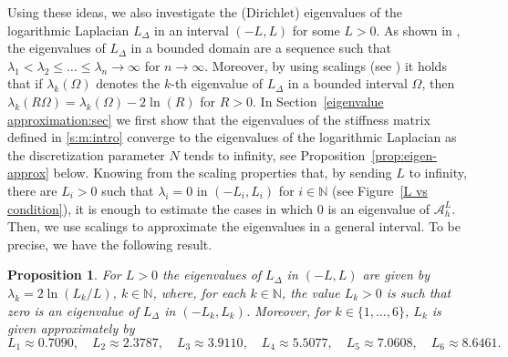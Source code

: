 \documentclass[10 pt]{article}
\newtheorem{proposition}[theorem]{Proposition}
\numberwithin{equation}{section}
\def\N{\mathbb{N}}
\begin{document}
Using these ideas, we also investigate the (Dirichlet) eigenvalues of the logarithmic Laplacian $L_{\Delta}$ in an interval $(-L,L)$ for some $L>0$. As shown in \cite[Theorem 1.4]{CW19}, the eigenvalues of $L_{\Delta}$ in a bounded domain are a sequence such that $\lambda_1<\lambda_2\leq \ldots\leq\lambda_n\to \infty$ for $n\to\infty$.  Moreover, by using scalings (see \cite[Lemma 2.5]{LW21}) it holds that if $\lambda_k(\Omega)$ denotes the $k$-th eigenvalue of $L_{\Delta}$ in a bounded interval $\Omega$, then $\lambda_k(R\Omega)=\lambda_k(\Omega)-2\ln(R)$ for $R>0$. In Section~\ref{eigenvalue approximation:sec} we first show that the eigenvalues of the stiffness matrix defined in \eqref{s:m:intro} converge to the eigenvalues of the logarithmic Laplacian as the discretization parameter $N$ tends to infinity, see Proposition~\ref{prop:eigen-approx} below. Knowing from the scaling properties that, by sending $L$ to infinity, there are $L_i>0$ such that $\lambda_i=0$ in $(-L_i,L_i)$  for $i\in \N$ (see Figure~\ref{L vs condition}), it is enough to estimate the cases in which $0$ is an eigenvalue of $\mathcal{A}^L_h$. Then, we use scalings to approximate the eigenvalues in a general interval. To be precise, we have the following result.
\begin{proposition}\label{eigenvalue approximation}
For $L>0$ the eigenvalues of $L_{\Delta}$ in $(-L,L)$ are given by $\lambda_k=2\ln(L_k/L)$, $k\in \N$, where, for each $k\in \N$, the value $L_k>0$ is such that zero is an eigenvalue of $L_{\Delta}$ in $(-L_k,L_k)$. Moreover, for $k\in\{1,\ldots,6\}$, $L_k$ is given approximately by
\begin{equation*}
L_1\approx 0.7090, \quad L_2\approx 2.3787,\quad L_3\approx 3.9110,\quad L_4\approx 5.5077, \quad L_5\approx 7.0608,\quad L_6\approx 8.6461.
\end{equation*}
\end{proposition}
%
\end{document}
